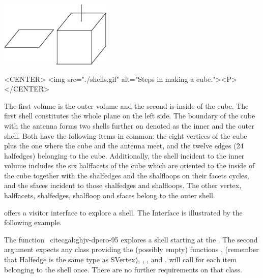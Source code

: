 \begin{ccTexOnly}
    \begin{center}
      \parbox{0.4\textwidth}{%
          \includegraphics[width=0.4\textwidth]{Nef_3/fig/shells}%
      }
    \end{center}
\end{ccTexOnly}

\begin{ccHtmlOnly}
    <CENTER>
        <img src="./shells.gif" alt="Steps in making a cube."><P>
    </CENTER>
\end{ccHtmlOnly}


The first volume is the outer
volume and the second is inside of the cube. The first shell constitutes the
whole plane on the left side. The boundary of the cube with the antenna
forms two shells further on denoted as the inner and the outer shell. 
Both have the following items in common: 
the eight vertices of the cube plus the one where the cube
and the antenna meet, and 
the twelve edges (24 halfedges) belonging to the cube. Additionally,
the shell incident to the inner volume includes the six halffacets of the 
cube which are oriented to the inside of the cube together with the shalfedges
and the shalfloops on their facets cycles, and the sfaces incident to those
shalfedges and shalfloops. The other vertex, halffacets, shalfedges, shalfloop
and sfaces belong to the outer shell.

  offers a visitor interface to explore a shell.
The Interface is illustrated by the following example.


The function 
~cite{cgal:ghjv-dpero-95} 
explores a shell starting at the . The second argument expects any
class providing the (possibly empty) functions ,
 (remember that Halfedge is the same type as
SVertex), 
, , 
 and . 
 will call  for each item belonging
to the shell once. There are no further requirements on that class. 

